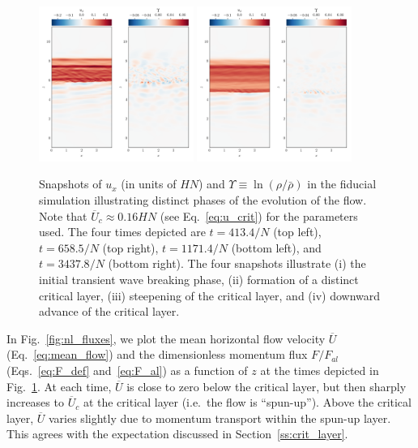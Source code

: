 \documentclass[
        fleqn,
        usenatbib,
        referee,
    ]{mnras}
\newcommand*{\p}[1]{\left(#1\right)}
\begin{document}
\begin{figure}
    \includegraphics[width=0.45\textwidth]{plots/yubo_000153.png}\hfil
    \includegraphics[width=0.45\textwidth]{plots/yubo_000451.png}
    \caption{Snapshots of $u_x$ (in units of $HN$) and $\Upsilon \equiv
    \ln\p{\rho / \bar{\rho}}$ in the fiducial simulation illustrating distinct
    phases of the evolution of the flow. Note that $\overline{U}_c \approx
    0.16HN$ (see Eq.~\eqref{eq:u_crit}) for the parameters used. The four times
    depicted are $t = 413.4/N$ (top left), $t = 658.5/N$ (top right), $t =
    1171.4/N$ (bottom left), and $t = 3437.8/N$ (bottom right). The four
    snapshots illustrate (i) the initial transient wave breaking phase, (ii)
    formation of a distinct critical layer, (iii) steepening of the critical
    layer, and (iv) downward advance of the critical
    layer.}\label{fig:snapshots}
\end{figure}

In Fig.~\ref{fig:nl_fluxes}, we plot the mean horizontal flow velocity
$\overline{U}$ (Eq.~\eqref{eq:mean_flow}) and the dimensionless momentum flux $F
/ F_{al}$ (Eqs.~\eqref{eq:F_def} and~\eqref{eq:F_al}) as a function of $z$ at
the times depicted in Fig.~\ref{fig:snapshots}. At each time, $\overline{U}$ is
close to zero below the critical layer, but then sharply increases to
$\overline{U}_c$ at the critical layer (i.e.\ the flow is ``spun-up''). Above
the critical layer, $\overline{U}$ varies slightly due to momentum transport
within the spun-up layer. This agrees with the expectation discussed in
Section~\ref{ss:crit_layer}.
\end{document}
